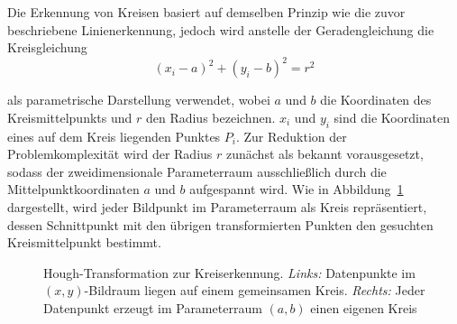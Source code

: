 Die Erkennung von Kreisen basiert auf demselben Prinzip wie die zuvor beschriebene Linienerkennung, jedoch wird anstelle der Geradengleichung die Kreisgleichung 
\[
(x_i - a)^2 + (y_i - b)^2 = r^2
\]

als parametrische Darstellung verwendet, wobei $a$ und $b$ die Koordinaten des Kreismittelpunkts und $r$ den Radius bezeichnen. $x_i$ und $y_i$ sind die Koordinaten eines auf dem Kreis liegenden Punktes $P_i$. Zur Reduktion der Problemkomplexität wird der Radius $r$ zunächst als bekannt vorausgesetzt, sodass der zweidimensionale Parameterraum ausschließlich durch die Mittelpunktkoordinaten $a$ und $b$ aufgespannt wird. Wie in Abbildung~\ref{fig:hough-transformation} dargestellt, wird jeder Bildpunkt im Parameterraum als Kreis repräsentiert, dessen Schnittpunkt mit den übrigen transformierten Punkten den gesuchten Kreismittelpunkt bestimmt. \cite{illingworth_survey_1988}

\begin{figure}[H]
  \centering


  \caption{Hough-Transformation zur Kreiserkennung. \textit{Links:} Datenpunkte im $(x,y)$-Bildraum liegen auf einem gemeinsamen Kreis. \textit{Rechts:} Jeder Datenpunkt erzeugt im Parameterraum $(a,b)$ einen eigenen Kreis}
  \label{fig:hough-transformation}

\end{figure}


